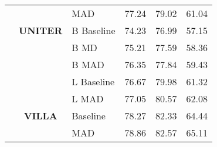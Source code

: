 \documentclass[runningheads]{llncs}
\begin{document}
\begin{table*}[h!]
{\begin{tabular}{|c|c|l|ccc|}
                                                                                   & \textbf{}                                                               & MAD                                              & \multicolumn{1}{c|}{77.24}        & \multicolumn{1}{c|}{79.02}         & 61.04         \\ \cline{2-6}
                                                                                   & \textbf{UNITER}                                                         & B Baseline                                       & \multicolumn{1}{c|}{74.23}        & \multicolumn{1}{c|}{76.99}         & 57.15         \\ \cline{2-6}
                                                                                   & \textbf{}                                                               & B MD                                              & \multicolumn{1}{c|}{75.21}        & \multicolumn{1}{c|}{77.59}         & 58.36         \\ \cline{2-6}
                                                                                   & \textbf{}                                                               & B MAD                                     & \multicolumn{1}{c|}{76.35}        & \multicolumn{1}{c|}{77.84}         & 59.43         \\ \cline{2-6}
                                                                                   & \textbf{}                                                               & L Baseline                                       & \multicolumn{1}{c|}{76.67}        & \multicolumn{1}{c|}{79.98}         & 61.32         \\ \cline{2-6}
                                                                                   & \textbf{}                                                               & L MAD                                     & \multicolumn{1}{c|}{77.05}        & \multicolumn{1}{c|}{80.57}         & 62.08         \\ \cline{2-6}
                                                                                   & \textbf{VILLA}                                                          & Baseline                                         & \multicolumn{1}{c|}{78.27}        & \multicolumn{1}{c|}{82.33}         & 64.44         \\ \cline{2-6}
                                                                                   & \textbf{}                                                               & MAD                                       & \multicolumn{1}{c|}{78.86}        & \multicolumn{1}{c|}{82.57}         & 65.11         \\ \cline{2-6}

\end{tabular}}
\end{table*}
\end{document}
